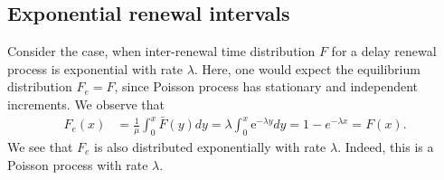 \documentclass[a4paper,10pt,english]{article}
\begin{document}
\subsection{Exponential renewal intervals}
Consider the case, when inter-renewal time distribution $F$ for a delay renewal process is exponential with rate $\lambda$. 
Here, one would expect the equilibrium distribution $F_e = F$, since Poisson process has stationary and independent increments. 
We observe that 
\begin{align*}
F_e(x) &= \frac{1}{\mu} \int_{0}^{x}\bar{F}(y)dy = \lambda \int_{0}^{x} \mathrm{e}^{-\lambda y} dy = 1 - e^{- \lambda x} = F(x).
\end{align*}	
We see that $F_e$ is also distributed exponentially with rate $\lambda$. 
Indeed, this is a Poisson process with rate $\lambda$. 
\end{document}
